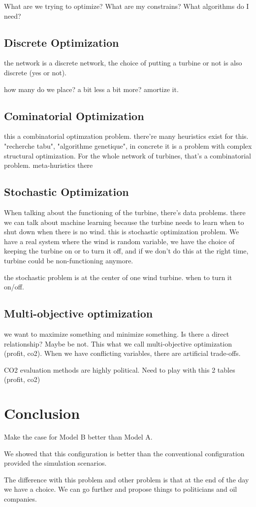 \documentclass[12pt]{article}
\begin{document}
What are we trying to optimize? What are my constrains? What algorithms do I need?

\subsection{Discrete Optimization}
the network is a discrete network, the choice of putting a turbine or not is also
discrete (yes or not). 

how many do we place? a bit less a bit more? amortize it.

\subsection{Cominatorial Optimization}
this a combinatorial optimzation problem. there're many heuristics exist for this. 
"recherche tabu", "algorithme genetique", in concrete it is a problem with complex
structural optimization. 
For the whole network of turbines, that's a combinatorial problem. meta-huristics there


\subsection{Stochastic Optimization}
When talking about the functioning of the turbine, there's data problems.
there we can talk about machine learning because the turbine needs to learn when to shut down when there is no wind. this is stochastic optimization problem. We have a real 
system where the wind is random variable, we have the choice of keeping the turbine on or to turn it off, and if we don't do this at the right time, turbine could be non-functioning anymore. 

the stochastic problem is at the center of one wind turbine. when to turn it on/off.

\subsection{Multi-objective optimization}
we want to maximize something and minimize something. Is there a direct relationship?
Maybe be not. This what we call multi-objective optimization (profit, co2). When we have conflicting variables, there are artificial trade-offs. 

CO2 evaluation methods are highly political. Need to play with this 2 tables (profit, co2)

\section{Conclusion}

Make the case for Model B better than Model A. 

We showed that this configuration is better than the conventional configuration provided the simulation scenarios. 

The difference with this problem and other problem is that at the end of the day we have a choice. We can go further and propose things to politicians and oil companies. 
\end{document}
